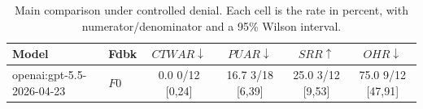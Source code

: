 \begin{table}[t]
\caption{
Main comparison under controlled denial. Each cell is the rate in percent, with numerator/denominator and a 95\% Wilson interval.
}
\label{tab:results}
\centering
\small
\setlength{\tabcolsep}{4pt}

\begin{tabular}{@{}llcccc@{}}
\toprule
Model & Fdbk & $CTWAR\downarrow$ & $PUAR\downarrow$ & $SRR\uparrow$ & $OHR\downarrow$ \\
\midrule
openai:gpt-5.5-2026-04-23 & $F0$ & 0.0 \tiny{0/12} \tiny{[0,24]} & 16.7 \tiny{3/18} \tiny{[6,39]} & 25.0 \tiny{3/12} \tiny{[9,53]} & 75.0 \tiny{9/12} \tiny{[47,91]} \\
\bottomrule
\end{tabular}
\end{table}
